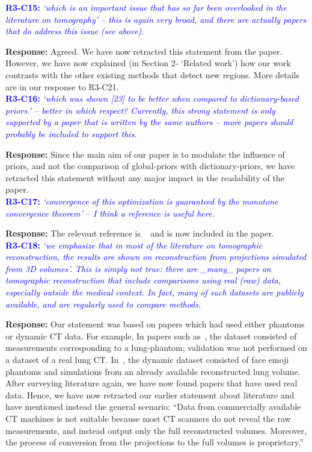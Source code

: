 \documentclass{article}
\begin{document}
\textcolor{blue}{\textbf{R3-C15:}\textit{ `which is an important issue that has so far been overlooked in the literature on tomography' -- this is again very broad, and there are actually papers that do address this issue (see above).}}

\textbf{Response:} Agreed. We have now retracted this statement from the paper. However, we have now explained (in Section 2- `Related work') how our work contrasts with the other existing methods that detect new regions. More details are in our response to R3-C21.\\
 
\textcolor{blue}{\textbf{R3-C16:}\textit{ `which was shown [23] to be better when compared to dictionary-based priors.' -- better in which respect? Currently, this strong statement is only supported by a paper that is written by the same authors -- more papers should probably be included to support this.}}

\textbf{Response:} Since the main aim of our paper is to modulate the influence of priors, and not the comparison of global-priors with dictionary-priors, we have retracted this statement without any major impact in the readability of the paper. \\

\textcolor{blue}{\textbf{R3-C17:}\textit{ `convergence of this optimization is guaranteed by the monotone convergence theorem' -- I think a reference is useful here.}}

\textbf{Response:} The relevant reference is ~\cite{monotone} and is now included in the paper.\\

\textcolor{blue}{\textbf{R3-C18:}\textit{ `we emphasize that in most of the literature on tomographic reconstruction, the results are shown on reconstruction from projections simulated from 3D volumes'. This is simply not true: there are \_many\_ papers on tomographic reconstruction that include comparisons using real (raw) data, especially outside the medical context. In fact, many of such datasets are publicly available, and are regularly used to compare methods.}}

\textbf{Response:} Our statement was based on papers which had used either phantoms or dynamic CT data. For example, In papers such as~\cite{pirple}, the dataset consisted of measurements corresponding to a lung-phantom; validation was not performed on a dataset of a real lung CT. In~\cite{Hakka2019}, the dynamic dataset consisted of face emoji phantoms and simulations from an already available reconstructed lung volume. After surveying literature again, we have now found papers that have used real data. Hence,  we have now retracted our earlier statement about literature and have mentioned instead the general scenario: ``Data from commercially available CT machines is not suitable because most CT scanners do not reveal the raw measurements, and instead output only the full reconstructed volumes. Moreover, the process of conversion from the  projections to the full volumes is proprietary.'' \\
\end{document}
